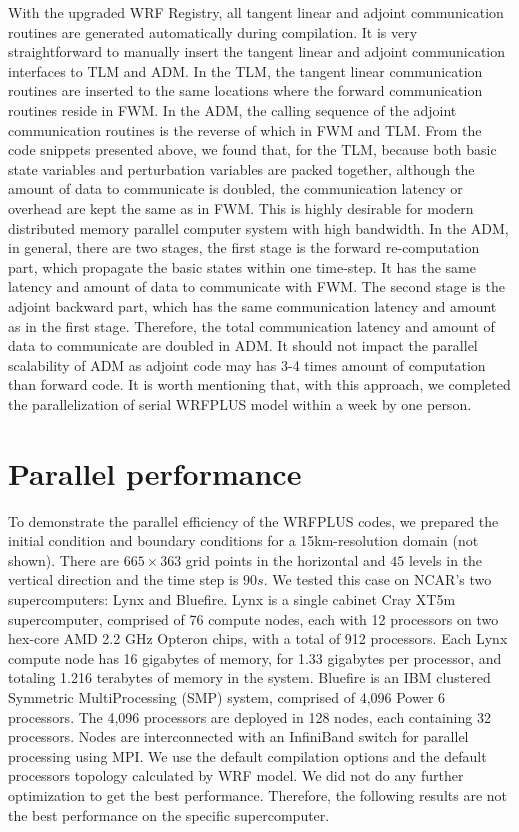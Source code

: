\documentclass[12pt]{article}
\begin{document}
With the upgraded WRF Registry, all tangent linear and adjoint communication routines are generated automatically during compilation. It is very straightforward to manually insert the tangent linear and adjoint communication interfaces to TLM and ADM. In the TLM,  the tangent linear communication routines are inserted to the same locations where the forward communication routines reside in FWM. In the ADM, the calling sequence of the adjoint communication routines is the reverse of which in FWM and TLM. From the code snippets presented above, we found that, for the TLM, because both basic state variables and perturbation variables are packed together, although the amount of data to communicate is doubled, the communication latency or overhead are kept the same as in FWM. This is highly desirable for modern distributed memory parallel computer system with high bandwidth. In the ADM, in general, there are two stages, the first stage is the forward re-computation part, which propagate the basic states within one time-step. It has the same latency and amount of data to communicate with FWM.  The second stage is the adjoint backward part, which has the same communication latency and amount as in the first stage. Therefore, the total communication latency and amount of data to communicate are doubled in ADM. It should not impact the parallel scalability of ADM as adjoint code may has 3-4 times amount of computation than forward code. It is worth mentioning that, with this approach, we completed the parallelization of serial WRFPLUS model within a week by one person. 


\section{Parallel performance}

To demonstrate the parallel efficiency of the WRFPLUS codes, we prepared the initial condition and boundary conditions for a 15km-resolution domain (not shown). There are $665\times363$ grid points in the horizontal and $45$ levels in the vertical direction and the time step is $90s$. We tested this case on NCAR's two supercomputers: Lynx and Bluefire. Lynx is a single cabinet Cray XT5m supercomputer, comprised of 76 compute nodes, each with 12 processors on two hex-core AMD 2.2 GHz Opteron chips, with a total of 912 processors. Each Lynx compute node has 16 gigabytes of memory, for 1.33 gigabytes per processor, and totaling 1.216 terabytes of memory in the system. Bluefire is an IBM clustered Symmetric MultiProcessing (SMP) system, comprised of 4,096 Power 6 processors. The 4,096 processors are deployed in 128 nodes, each containing 32 processors. Nodes are interconnected with an InfiniBand switch for parallel processing using MPI. We use the default compilation options and the default processors topology calculated by WRF model. We did not do any further optimization to get the best performance. Therefore, the following results are not the best performance on the specific supercomputer.
\end{document}
